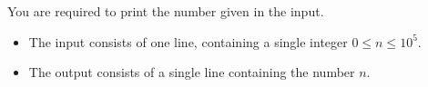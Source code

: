 \documentclass{bapc}
\begin{document}

\newcommand{\identitymaxn}{10^5}

You are required to print the number given in the input.

\begin{Input}
	\begin{itemize}
		\item The input consists of one line, containing a single integer $0\leq n\leq \identitymaxn$.
	\end{itemize}
\end{Input}

\begin{Output}
	\begin{itemize}
		\item The output consists of a single line containing the number $n$.
	\end{itemize}
\end{Output}

\end{document}
